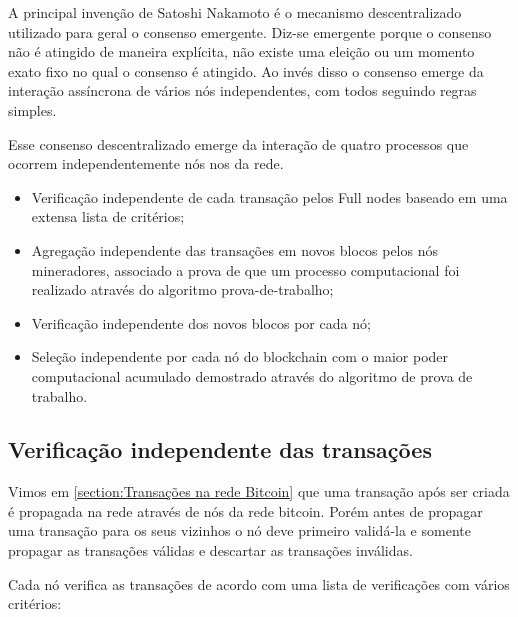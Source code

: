 \documentclass[conference,compsoc]{IEEEtran}
\begin{document}
A principal invenção de Satoshi Nakamoto é o mecanismo descentralizado utilizado para geral o consenso emergente. Diz-se emergente porque o consenso não é atingido de maneira explícita, não existe uma eleição ou um momento exato fixo no qual o consenso é atingido. Ao invés disso o consenso emerge da interação assíncrona de vários nós independentes, com todos seguindo regras simples.

Esse consenso descentralizado emerge da interação de quatro processos que ocorrem independentemente nós nos da rede.

\begin{itemize}
  \item Verificação independente de cada transação pelos Full nodes baseado em uma extensa lista de critérios;
  \item Agregação independente das transações em novos blocos pelos nós mineradores, associado a prova de que um processo computacional foi realizado através do algoritmo prova-de-trabalho;
  \item Verificação independente dos novos blocos por cada nó;
  \item Seleção independente por cada nó do blockchain com o maior poder computacional acumulado demostrado através do algoritmo de prova de trabalho.
\end{itemize}  

\subsection*{Verificação independente das transações}
Vimos em \ref{section:Transações na rede Bitcoin} que uma transação após ser criada é propagada na rede através de nós da rede bitcoin. Porém antes de propagar uma transação para os seus vizinhos o nó deve primeiro validá-la e somente propagar as transações válidas e descartar as transações inválidas.

Cada nó verifica as transações de acordo com uma lista de verificações com vários critérios:
\end{document}
